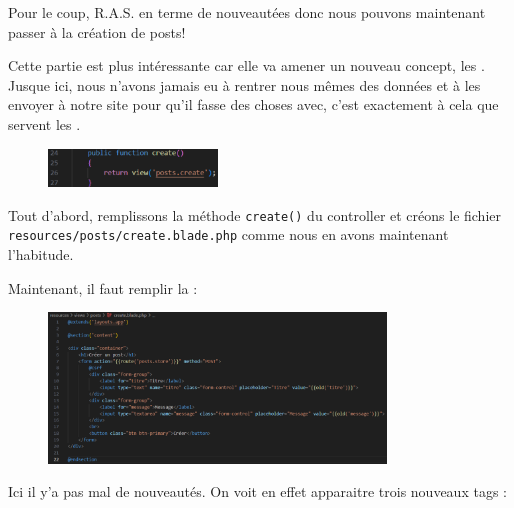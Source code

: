 \documentclass[internal]{nhitec_design}
\begin{document}
Pour le coup, R.A.S. en terme de nouveautées donc nous pouvons maintenant passer à la création de posts!

\newpage


Cette partie est plus intéressante car elle va amener un nouveau concept, les \forms{}. Jusque ici, nous n'avons jamais eu à rentrer nous mêmes des données et à les envoyer à notre site pour qu'il fasse des choses avec, c'est exactement à cela que servent les \forms{}.

\begin{figure}
    \vspace{-0.5cm}
    \includegraphics[width=0.4\textwidth]{figures-C1/post_create_controller.pdf}
\end{figure}
Tout d'abord, remplissons la méthode \verb|create()| du controller et créons le fichier \\ \verb|resources/posts/create.blade.php| comme nous en avons maintenant l'habitude.

Maintenant, il faut remplir la \blade:

\begin{figure}[!h]
    \centering
    \includegraphics[width=0.8\textwidth]{figures-C1/post_create_blade.pdf}
\end{figure}
Ici il y'a pas mal de nouveautés. On voit en effet apparaitre trois nouveaux tags \html:
\end{document}
